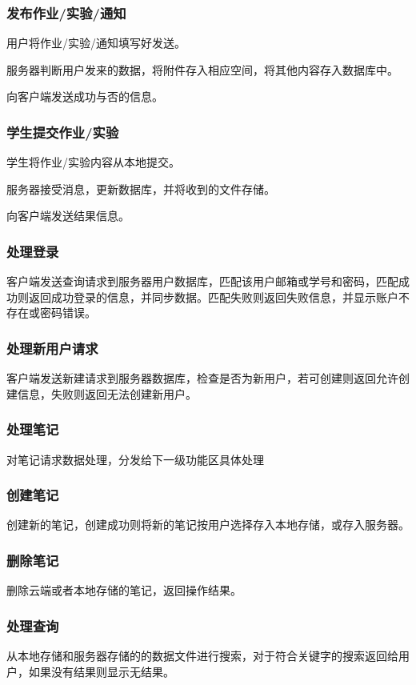 \subsubsection{发布作业/实验/通知}
用户将作业/实验/通知填写好发送。

服务器判断用户发来的数据，将附件存入相应空间，将其他内容存入数据库中。

向客户端发送成功与否的信息。

\subsubsection{学生提交作业/实验}
学生将作业/实验内容从本地提交。

服务器接受消息，更新数据库，并将收到的文件存储。

向客户端发送结果信息。

\subsubsection{处理登录}
客户端发送查询请求到服务器用户数据库，匹配该用户邮箱或学号和密码，匹配成功则返回成功登录的信息，并同步数据。匹配失败则返回失败信息，并显示账户不存在或密码错误。

\subsubsection{处理新用户请求}
客户端发送新建请求到服务器数据库，检查是否为新用户，若可创建则返回允许创建信息，失败则返回无法创建新用户。

\subsubsection{处理笔记}
对笔记请求数据处理，分发给下一级功能区具体处理

\subsubsection{创建笔记}
创建新的笔记，创建成功则将新的笔记按用户选择存入本地存储，或存入服务器。

\subsubsection{删除笔记}
删除云端或者本地存储的笔记，返回操作结果。

\subsubsection{处理查询}
从本地存储和服务器存储的的数据文件进行搜索，对于符合关键字的搜索返回给用户，如果没有结果则显示无结果。
